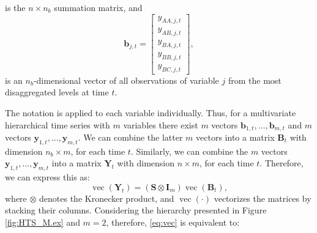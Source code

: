 \documentclass[a4paper,preprint,11pt,authoryear]{elsarticle}
\DeclareMathOperator{\vetor}{vec}
\begin{document}
is the $n\times n_b$ summation matrix, and
\begin{equation*}
  \bm{b}_{j,t} =
  \begin{bmatrix}
    y_{AA,j,t} \\y_{AB,j,t}\\y_{BA,j,t}\\y_{BB,j,t}\\y_{BC,j,t}
  \end{bmatrix},
\end{equation*}
is an $n_b$-dimensional vector of all observations of variable $j$ from the most disaggregated levels at time $t$.

The notation is applied to each variable individually. Thus, for a multivariate hierarchical time series with $m$ variables there exist $m$ vectors $\bm{b}_{1,t},\dots,\bm{b}_{m,t}$ and $m$ vectors $\bm{y}_{1,t},\dots,\bm{y}_{m,t}$. We can combine the latter $m$ vectors into a matrix $\bm{B}_t$ with dimension $n_b \times m$, for each time $t$. Similarly, we can combine the $m$ vectors $\bm{y}_{1,t},\dots,\bm{y}_{m,t}$ into a matrix $\bm{Y}_t$ with dimension $n \times m$, for each time $t$. Therefore, we can express this as:
\begin{equation}
  \vetor(\bm{Y}_t) = (\bm{S} \otimes \bm{I}_m)\vetor(\bm{B}_t),
  \label{eq:vec}
\end{equation}
where $\otimes$ denotes the Kronecker product, and $\vetor(\cdot)$ vectorizes the matrices by stacking their columns. Considering the hierarchy presented in Figure \ref{fig:HTS_M.ex} and $m = 2$, therefore, \eqref{eq:vec} is equivalent to:
\end{document}
